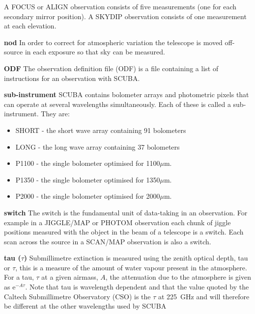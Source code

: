 \documentclass[twoside,11pt]{article}
\newcommand{\micron}           {$\mu$m}
\newcommand{\htmladdnormallink}[2]{#1}
\renewcommand{\_}{\texttt{\symbol{95}}}
\begin{document}
\begin{description}
A FOCUS or ALIGN observation consists of five measurements (one for each
secondary mirror position). A SKYDIP observation consists of one measurement
at each elevation.

\item{{\bf nod}} In order to correct for atmospheric variation the telescope
is moved off-source in each exposure so that sky can be measured.

\item{{\bf ODF}} The observation definition file (ODF) is a file containing a
list of instructions for an observation with SCUBA.

\item{{\bf sub-instrument}} SCUBA contains bolometer arrays and photometric
pixels that can operate at several wavelengths simultaneously. Each of these
is called a sub-instrument. They are:

\begin{itemize}
\item SHORT - the short wave array containing 91 bolometers
\item LONG - the long wave array containing 37 bolometers
\item P1100 - the single bolometer optimised for 1100\micron.
\item P1350 - the single bolometer optimised for 1350\micron.
\item P2000 - the single bolometer optimised for 2000\micron.
\end{itemize}


\item{{\bf switch}} The switch is the fundamental unit of data-taking in an
observation. For example in a JIGGLE/MAP or PHOTOM observation each chunk of
jiggle positions measured with the object in the beam of a telescope is a
switch. Each scan across the source in a SCAN/MAP observation is also a switch.
 
\item{{\bf tau ($\tau$)}} Submillimetre extinction is measured using the
zenith optical depth, tau or $\tau$, this is a measure of the amount of water
vapour present in the atmosphere. For a tau, $\tau$ at a given airmass, $A$,
the attenuation due to the atmosphere is given as e$^{-A \tau}$. Note that tau
is wavelength dependent and that the value quoted by the 
\htmladdnormallink{Caltech Submillimetre
Observatory}{http://www.cco.caltech.edu/\~{}cso/} (CSO) is the $\tau$ at 225~GHz and will therefore be different at 
the other wavelengths used by SCUBA

\end{description}
\end{document}
